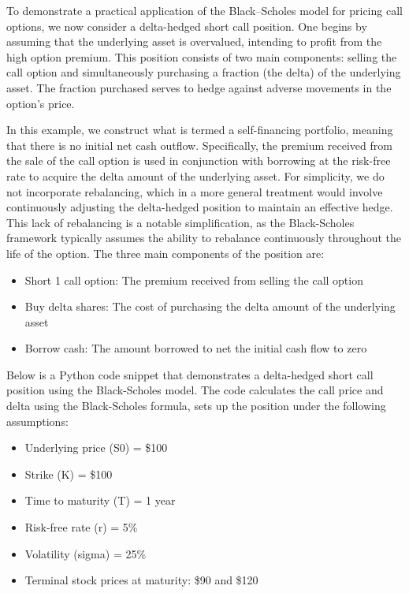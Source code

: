     To demonstrate a practical application of the Black--Scholes model for pricing call options,
    we now consider a delta-hedged short call position.
    One begins by assuming that the underlying asset is overvalued, intending to profit from the high option premium.
    This position consists of two main components:
    selling the call option and simultaneously purchasing a fraction (the delta) of the underlying asset.
    The fraction purchased serves to hedge against adverse movements in the option’s price.

    In this example, we construct what is termed a self-financing portfolio, meaning that there is
    no initial net cash outflow. Specifically, the premium received from the sale of the call option
    is used in conjunction with borrowing at the risk-free rate to acquire the delta amount of the
    underlying asset. For simplicity, we do not incorporate rebalancing, which in a more general
    treatment would involve continuously adjusting the delta-hedged position to maintain an effective hedge.
    This lack of rebalancing is a notable simplification, as the Black-Scholes framework typically assumes
    the ability to rebalance continuously throughout the life of the option.
    The three main components of the position are:

    \begin{itemize}
        \item Short 1 call option: The premium received from selling the call option
        \item Buy delta shares: The cost of purchasing the delta amount of the underlying asset
        \item Borrow cash: The amount borrowed to net the initial cash flow to zero
        \label{eq:position_components}
    \end{itemize}

    Below is a Python code snippet that demonstrates a delta-hedged short call position using the Black-Scholes model.
    The code calculates the call price and delta using the Black-Scholes formula, sets up the position under the
    following assumptions:

    \begin{itemize}
        \item Underlying price (S0) = \$100
        \item Strike (K) = \$100
        \item Time to maturity (T) = 1 year
        \item Risk-free rate (r) = 5\%
        \item Volatility (sigma) = 25\%
        \item Terminal stock prices at maturity: \$90 and \$120
        \label{eq:position_setup}
    \end{itemize}

